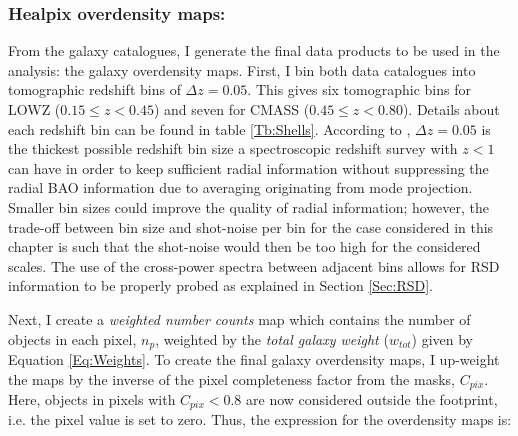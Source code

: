 \subsubsection{Healpix overdensity maps:}\label{Sec:Maps}
 From the galaxy catalogues, I generate the final data products to be used in the analysis: the galaxy overdensity \healpix maps. First, I bin both data catalogues into tomographic redshift bins of $\Delta z = 0.05$. This gives six tomographic bins for LOWZ ($0.15 \leq z < 0.45$) and seven for CMASS ($0.45 \leq z < 0.80$). Details about each redshift bin can be found in table \ref{Tb:Shells}. According to \cite{Asorey2012}, $\Delta z = 0.05$ is the thickest possible redshift bin size a spectroscopic redshift survey with $z < 1$ can have in order to keep sufficient radial information without suppressing the radial BAO information due to averaging originating from mode projection. Smaller bin sizes could improve the quality of radial information; however, the trade-off between bin size and shot-noise per bin for the case considered in this chapter is such that the shot-noise would then be too high for the considered scales. The use of the cross-power spectra between adjacent bins allows for RSD information to be properly probed as explained in Section \ref{Sec:RSD}.

\qquad Next, I create a \textit{weighted number counts} map which contains the number of objects in each \healpix pixel, $n_p$, weighted by the \textit{total galaxy weight} ($w_{tot}$) given by Equation \eqref{Eq:Weights}. To create the final galaxy overdensity maps, I up-weight the maps by the inverse of the pixel completeness factor from the masks, $C_{pix}$. Here, objects in pixels with $C_{pix} <  0.8$ are now considered outside the footprint, i.e. the pixel value is set to zero. Thus, the expression for the overdensity maps is:

